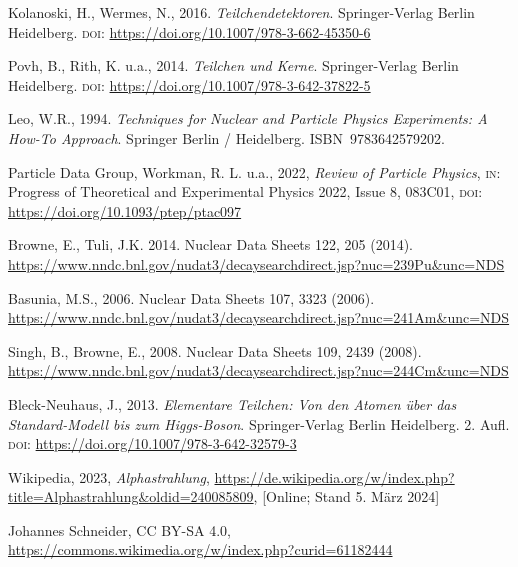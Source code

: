\documentclass{scrartcl}
\begin{document}






\clearpage
\begin{thebibliography}{1}
	Kolanoski, H., Wermes, N., 2016. \emph{Teilchendetektoren}. Springer-Verlag Berlin Heidelberg. \textsc{doi:} \url{https://doi.org/10.1007/978-3-662-45350-6}
	
	Povh, B., Rith, K. u.a., 2014. \emph{Teilchen und Kerne}. Springer-Verlag Berlin Heidelberg. \textsc{doi:} \url{https://doi.org/10.1007/978-3-642-37822-5}
	
	Leo, W.R., 1994. \emph{Techniques for Nuclear and Particle Physics Experiments: A How-To Approach}. Springer Berlin / Heidelberg. ISBN 9783642579202. 
	
	Particle Data Group, Workman, R. L. u.a., 2022, \emph{Review of Particle Physics}, \textsc{in:} Progress of Theoretical and Experimental Physics 2022, Issue 8, 083C01, \textsc{doi:} \url{https://doi.org/10.1093/ptep/ptac097}
	
	Browne, E., Tuli, J.K. 2014. Nuclear Data Sheets 122, 205 (2014). \url{https://www.nndc.bnl.gov/nudat3/decaysearchdirect.jsp?nuc=239Pu&unc=NDS}
	
	Basunia, M.S., 2006. Nuclear Data Sheets 107, 3323 (2006). \url{https://www.nndc.bnl.gov/nudat3/decaysearchdirect.jsp?nuc=241Am&unc=NDS}
	
	Singh, B., Browne, E., 2008. Nuclear Data Sheets 109, 2439 (2008). \url{https://www.nndc.bnl.gov/nudat3/decaysearchdirect.jsp?nuc=244Cm&unc=NDS}

	Bleck-Neuhaus, J., 2013. \emph{Elementare Teilchen: Von den Atomen über das Standard-Modell bis zum Higgs-Boson}. Springer-Verlag Berlin Heidelberg. 2. Aufl. \textsc{doi:} \url{https://doi.org/10.1007/978-3-642-32579-3}
	
	Wikipedia, 2023, \emph{Alphastrahlung}, \url{https://de.wikipedia.org/w/index.php?title=Alphastrahlung&oldid=240085809},
	[Online; Stand 5. März 2024]
	
	Johannes Schneider, CC BY-SA 4.0, \url{ https://commons.wikimedia.org/w/index.php?curid=61182444}
\end{thebibliography}


	
\end{document}
